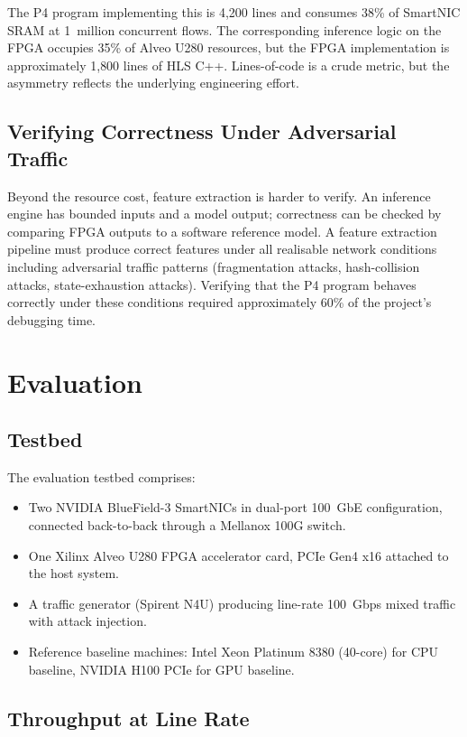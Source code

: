 \documentclass[sigconf,nonacm]{acmart}
\begin{document}
The P4 program implementing this is 4{,}200 lines and consumes 38\% of
SmartNIC SRAM at 1~million concurrent flows. The corresponding
inference logic on the FPGA occupies 35\% of Alveo U280 resources, but
the FPGA implementation is approximately 1{,}800 lines of HLS C++.
Lines-of-code is a crude metric, but the asymmetry reflects the
underlying engineering effort.

\subsection{Verifying Correctness Under Adversarial Traffic}

Beyond the resource cost, feature extraction is harder to verify. An
inference engine has bounded inputs and a model output; correctness can
be checked by comparing FPGA outputs to a software reference model. A
feature extraction pipeline must produce correct features under all
realisable network conditions including adversarial traffic patterns
(fragmentation attacks, hash-collision attacks, state-exhaustion attacks).
Verifying that the P4 program behaves correctly under these conditions
required approximately 60\% of the project's debugging time.

\section{Evaluation}

\subsection{Testbed}

The evaluation testbed comprises:

\begin{itemize}
  \item Two NVIDIA BlueField-3 SmartNICs in dual-port 100~GbE
        configuration, connected back-to-back through a Mellanox 100G
        switch.
  \item One Xilinx Alveo U280 FPGA accelerator card, PCIe Gen4 x16
        attached to the host system.
  \item A traffic generator (Spirent N4U) producing line-rate
        100~Gbps mixed traffic with attack injection.
  \item Reference baseline machines: Intel Xeon Platinum 8380
        (40-core) for CPU baseline, NVIDIA H100 PCIe for GPU baseline.
\end{itemize}

\subsection{Throughput at Line Rate}
\end{document}
